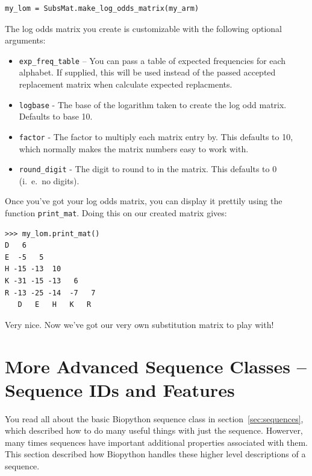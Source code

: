 \documentclass{report}
\begin{document}
\begin{verbatim}
my_lom = SubsMat.make_log_odds_matrix(my_arm)
\end{verbatim}

The log odds matrix you create is customizable with the following
optional arguments:


\begin{itemize}
  \item \verb|exp_freq_table| -- You can pass a table of expected
  frequencies for each alphabet. If supplied, this will be used
  instead of the passed accepted replacement matrix when calculate
  expected replacments.


  \item \verb|logbase| - The base of the logarithm taken to create the
  log odd matrix. Defaults to base 10.


  \item \verb|factor| - The factor to multiply each matrix entry
  by. This defaults to 10, which normally makes the matrix numbers
  easy to work with.


  \item \verb|round_digit| - The digit to round to in the matrix. This
  defaults to 0 (i.~e.~no digits).

\end{itemize}

Once you've got your log odds matrix, you can display it prettily
using the function \verb|print_mat|. Doing this on our created matrix
gives:

\begin{verbatim}
>>> my_lom.print_mat()
D   6
E  -5   5
H -15 -13  10
K -31 -15 -13   6
R -13 -25 -14  -7   7
   D   E   H   K   R
\end{verbatim}

Very nice. Now we've got our very own substitution matrix to play with!

\section{More Advanced Sequence Classes -- Sequence IDs and Features}
\label{sec:advanced-seq}

You read all about the basic Biopython sequence class in section~\ref{sec:sequences}, which described how to do many useful things with just the sequence. Howerver, many times sequences have important additional properties associated with them. This section described how Biopython handles these higher level descriptions of a sequence.
\end{document}
